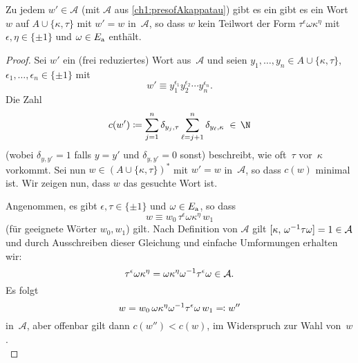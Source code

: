 \begin{thLemma}\label{ch1:wordsinAkappatau}
    Zu jedem $w'\in\mathcal A$ (mit $\mathcal A$ aus
    \cref{ch1:presofAkappatau}) gibt es ein
    gibt es ein Wort~$w$ auf $A\cup\{\kappa,\tau\}$
    mit $w'=w$ in~$\mathcal A$, so dass $w$ kein
    Teilwort der Form $\tau^\epsilon\omega\kappa^\eta$
    mit $\epsilon,\eta\in\{\pm1\}$ und $\omega\in E_{\mathrm a}$ enthält.
\end{thLemma}
%
\begin{proof}
    Sei $w'$ ein (frei reduziertes) Wort aus~$\mathcal A$
    und seien $y_1,\dots,y_n\in A\cup\{\kappa,\tau\}$,
    $\epsilon_1,\dots,\epsilon_n\in\{\pm1\}$
    mit
    \[ w' \equiv
        y_1^{\epsilon_1}y_2^{\epsilon_2}\cdots y_n^{\epsilon_n}
    . \]
    Die Zahl
    \[ c(w') \defeq \sum_{j=1}^n \delta_{y_j,\tau}
                        \sum_{\ell=j+1}^n \delta_{y_\ell,\kappa}
        \;\in\,\N
    \]
    (wobei $\delta_{y,y'} = 1$ falls $y=y'$ und $\delta_{y,y'} = 0$ sonst)
    beschreibt, wie oft~$\tau$ vor~$\kappa$ vorkommt.
    Sei nun $w\in (A\cup\{\kappa,\tau\})^*$ mit $w'=w$ in~$\mathcal A$,
    so dass $c(w)$ minimal ist. Wir zeigen nun, dass $w$ das gesuchte
    Wort ist.
    
    Angenommen, es gibt $\epsilon,\tau\in\{\pm1\}$ und $\omega\in E_{\mathrm a}$,
    so dass
    \[ w \equiv w_0 \, \tau^\epsilon\omega\kappa^\eta \, w_1 \]
    (für geeignete Wörter $w_0,w_1$) gilt. Nach Definition
    von $\mathcal A$ gilt $\cu[\kappa, \omega\inv\tau\omega] = 1
    \in\mathcal A$ und durch Ausschreiben dieser Gleichung und einfache
    Umformungen erhalten wir:
    \[ \tau^\epsilon\omega\kappa^\eta
        = \omega\kappa^\eta\omega^{-1}\tau^\epsilon\omega
        \in\mathcal A
    . \]
    Es folgt
    \[ w = w_0 \, \omega\kappa^\eta\omega^{-1}\tau^\epsilon\omega \, w_1
        \eqqcolon w''
    \]
    in~$\mathcal A$, aber offenbar gilt dann $c(w'') < c(w)$, im
    Widerspruch zur Wahl von~$w$.
    \\
\end{proof}

